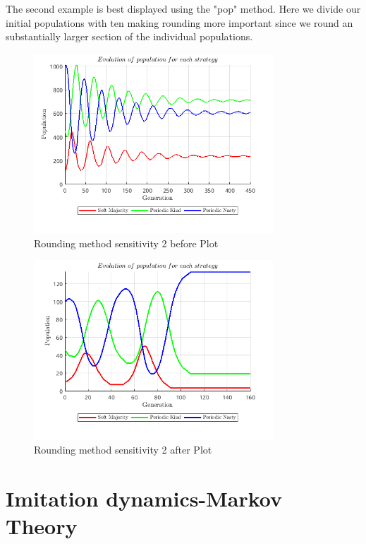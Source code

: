 \documentclass[12pt]{article}
\begin{document}
The second example is best displayed using the "pop" method. Here we divide our initial populations with ten making rounding more important since we round an substantially larger section of the individual populations.
\begin{figure}[H]
    \centering
    \includegraphics[width=0.8\textwidth]{media/rounding_method_sensitivity_2_before_pop.png}
    \caption{Rounding method sensitivity 2 before Plot}
\end{figure}
\begin{figure}[H]
    \centering
    \includegraphics[width=0.8\textwidth]{media/rounding_method_sensitivity_2_after_pop.png}
    \caption{Rounding method sensitivity 2 after Plot}
\end{figure}
\setcounter{figure}{0}
\section{Imitation dynamics-Markov Theory}
\end{document}
